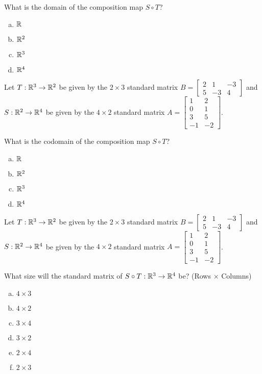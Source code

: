 \begin{applicationActivities}
\begin{activity}{5}
What is the domain of the composition map $S \circ T$?
\begin{enumerate}[(a)]
\item $\mathbb{R}$
\item $\mathbb{R}^2$
\item $\mathbb{R}^3$
\item $\mathbb{R}^4$
\end{enumerate}
\end{activity}

\begin{activity}{3}
Let $T: \mathbb{R}^3 \rightarrow \mathbb{R}^2$ be given by the \(2\times 3\) standard matrix $B=\begin{bmatrix} 2 & 1 & -3 \\ 5 & -3 & 4 \end{bmatrix}$ and $S: \mathbb{R}^2 \rightarrow \mathbb{R}^4$ be given by the \(4\times 2\) standard matrix $A=\begin{bmatrix} 1 & 2 \\ 0 & 1 \\ 3 & 5 \\ -1 & -2 \end{bmatrix}$.

What is the codomain of the composition map $S \circ T$?
\begin{enumerate}[(a)]
\item $\mathbb{R}$
\item $\mathbb{R}^2$
\item $\mathbb{R}^3$
\item $\mathbb{R}^4$
\end{enumerate}
\end{activity}

\begin{activity}{2}
Let $T: \mathbb{R}^3 \rightarrow \mathbb{R}^2$ be given by the \(2\times 3\) standard matrix $B=\begin{bmatrix} 2 & 1 & -3 \\ 5 & -3 & 4 \end{bmatrix}$ and $S: \mathbb{R}^2 \rightarrow \mathbb{R}^4$ be given by the \(4\times 2\) standard matrix $A=\begin{bmatrix} 1 & 2 \\ 0 & 1 \\ 3 & 5 \\ -1 & -2 \end{bmatrix}$.

What size will the standard matrix of $S \circ T:\mathbb{R}^3\to\mathbb{R}^4$ be?
(Rows \(\times\) Columns)
\begin{multicols}{3}
\begin{enumerate}[(a)]
\item $4 \times 3$
\item $4 \times 2$
\item $3 \times 4$
\item $3 \times 2$
\item $2 \times 4$
\item $2 \times 3$
\end{enumerate}
\end{multicols}
\end{activity}


\end{applicationActivities}
